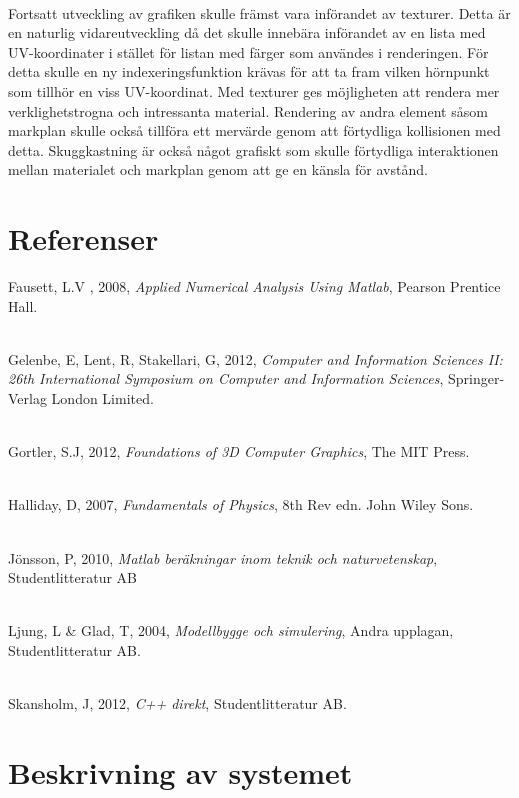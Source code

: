 \documentclass[a4paper,12pt,oneside,final,swedish]{extarticle}
\begin{document}
\noindent\\Fortsatt utveckling av grafiken skulle främst vara införandet av texturer. Detta är en naturlig vidareutveckling då det skulle innebära införandet av en lista med UV-koordinater i stället för listan med färger som användes i renderingen. För detta skulle en ny indexeringsfunktion krävas för att ta fram vilken hörnpunkt som tillhör en viss UV-koordinat. Med texturer ges möjligheten att rendera mer verklighetstrogna och intressanta material. Rendering av andra element såsom markplan skulle också tillföra ett mervärde genom att förtydliga kollisionen med detta. Skuggkastning är också något grafiskt som skulle förtydliga interaktionen mellan materialet och markplan genom att ge en känsla för avstånd.


\section{Referenser}
Fausett, L.V , 2008, \textit{Applied Numerical Analysis Using Matlab}, Pearson Prentice Hall.

\noindent \\Gelenbe, E, Lent, R, Stakellari, G, 2012, \textit{Computer and Information Sciences II: 26th International Symposium on Computer and Information Sciences}, Springer-Verlag London Limited.

\noindent \\Gortler, S.J, 2012, \textit{Foundations of 3D Computer Graphics}, The MIT Press.

\noindent \\Halliday, D, 2007, \textit{Fundamentals of Physics}, 8th Rev edn. John Wiley Sons.

\noindent \\Jönsson, P, 2010, \textit{Matlab beräkningar inom teknik och naturvetenskap}, Studentlitteratur AB

\noindent \\Ljung, L \& Glad, T, 2004, \textit{Modellbygge och simulering}, Andra upplagan, Studentlitteratur AB.

\noindent \\Skansholm, J, 2012, \textit{C++ direkt}, Studentlitteratur AB.




\appendix

\section{Beskrivning av systemet}
\end{document}
